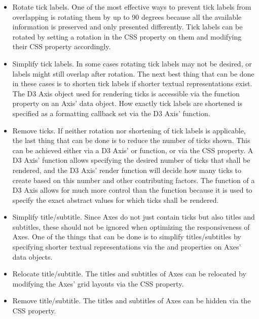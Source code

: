 \begin{itemize}

\item
Rotate tick labels.
One of the most effective ways to prevent tick labels from overlapping is rotating them by up to 90 degrees because all the available information is preserved and only presented differently.
Tick labels can be rotated by setting a rotation in the CSS  property on them and modifying their CSS  property accordingly. 

\item
Simplify tick labels.
In some cases rotating tick labels may not be desired, or labels might still overlap after rotation.
The next best thing that can be done in these cases is to shorten tick labels if shorter textual representations exist.
The D3 Axis object used for rendering ticks is accessible via the  function property on an Axis' data object.
How exactly tick labels are shortened is specified as a formatting callback set via the D3 Axis'  function.

\item
Remove ticks.
If neither rotation nor shortening of tick labels is applicable, the last thing that can be done is to reduce the number of ticks shown.
This can be achieved either via a D3 Axis'  or  function, or via the CSS  property.
A D3 Axis'  function allows specifying the desired number of ticks that shall be rendered, and the D3 Axis' render function will decide how many ticks to create based on this number and other contributing factors.
The  function of a D3 Axis allows for much more control than the  function because it is used to specify the exact abstract values for which ticks shall be rendered.

\item
Simplify title/subtitle.
Since Axes do not just contain ticks but also titles and subtitles, these should not be ignored when optimizing the responsiveness of Axes.
One of the things that can be done is to simplify titles/subtitles by specifying shorter textual representations via the  and  properties on Axes' data objects.

\item
Relocate title/subtitle.
The titles and subtitles of Axes can be relocated by modifying the Axes' grid layouts via the CSS  property. 

\item
Remove title/subtitle.
The titles and subtitles of Axes can be hidden via the CSS  property.

\end{itemize}

